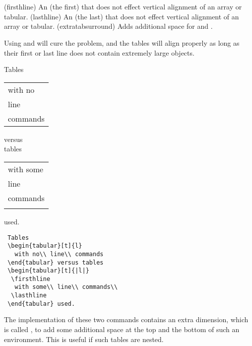 {{{{{{\begin{syntax}
\cmd{\firsthline} \cmd{\lasthline} \\
\lnc{\extratabsurround} \\
\end{syntax}
\glossary(firsthline)%
  {}%
  {An  (the first) that does not effect vertical alignment of an 
   array or tabular.}
\glossary(lasthline)%
  {}%
  {An  (the last) that does not effect vertical alignment of an 
   array or tabular.}
\glossary(extratabsurround)%
  {}
  {Adds additional space for  and .}

 Using \cmd{\firsthline} and \cmd{\lasthline} will 
 cure the problem, and the tables will align properly as long
 as their first or last line does not contain extremely large
 objects.
 \begin{center}
 \begin{minipage}[t]{.4\linewidth}
 Tables
 \begin{tabular}[t]{l}
   with no\\ line \\ commands 
 \end{tabular} versus \\ tables
 \begin{tabular}[t]{|l|}
  \firsthline
   with some\\ line \\ commands \\
  \lasthline
 \end{tabular} used.
 \end{minipage} 
 \begin{minipage}[t]{.52\linewidth}
 \begin{verbatim}
 Tables
 \begin{tabular}[t]{l}
   with no\\ line\\ commands
 \end{tabular} versus tables
 \begin{tabular}[t]{|l|}
  \firsthline
   with some\\ line\\ commands\\
  \lasthline
 \end{tabular} used.
 \end{verbatim}
 \end{minipage}
 \end{center}

 The implementation of these two commands contains an extra
 dimension, which is called \cmd{\extratabsurround}, to add some
 additional space at the top and the bottom of such an environment.
 This is useful if such tables are nested.

}}}}}}
